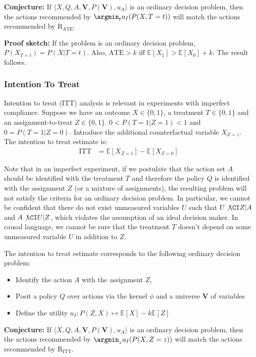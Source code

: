 \textbf{Conjecture:} If $\langle X,Q,A,\mathbf{V},P(\mathbf{V}),u_A\rangle$ is an ordinary decision problem, then the actions recommended by $\argmin_t u_I(P(X,T=t))$ will match the actions recommended by $\text{R}_{\text{ATE}}$.

\textbf{Proof sketch:} If the problem is an ordinary decision problem, $P(X_{T=t})=P(X|T=t)$. Also, $\text{ATE}>k$ iff $\mathbb{E}[X_1] > \mathbb{E}[X_0]+k$. The result follows.

\subsubsection{Intention To Treat}

Intention to treat (ITT) analysis is relevant in experiments with imperfect compliance. Suppose we have an outcome $X\in\{0,1\}$, a treatment $T\in\{0,1\}$ and an assignment-to-treat $Z\in\{0,1\}$. $0<P(T=1|Z=1)<1$ and $0=P(T=1|Z=0)$. Introduce the additional counterfactual variable $X_{Z=z}$. The intention to treat estimate is:
\begin{align}
    \text{ITT} &= \mathbb{E}[X_{Z=1}] - \mathbb{E}[X_{Z=0}]
\end{align}

Note that in an imperfect experiment, if we postulate that the action set $A$ should be identified with the treatment $T$ and therefore the policy $Q$ is identified with the assignment $Z$ (or a mixture of assignments), the resulting problem will not satisfy the criteria for an ordinary decision problem. In particular, we cannot be confident that there do not exist unmeasured variables $U$ such that $U\not\CI Z|A$ and $A\not\CI U|Z$, which violates the assumption of an ideal decision maker. In causal language, we cannot be sure that the treatment $T$ doesn't depend on some unmeasured variable $U$ in addition to $Z$.

The intention to treat estimate corresponds to the following ordinary decision problem:

\begin{itemize}
    \item Identify the action $A$ with the assignment $Z$, 
    \item Posit a policy $Q$ over actions via the kernel $\phi$ and a universe $\mathbf{V}$ of variables
    \item Define the utility $u_I: P(Z,X)\mapsto \mathbb{E}[X]-k\mathbb{E}[Z]$ 
\end{itemize}

\textbf{Conjecture:} If $\langle X,Q,A,\mathbf{V},P(\mathbf{V}),u_A\rangle$ is an ordinary decision problem, then the actions recommended by $\argmin_z u_I(P(X,Z=z))$ will match the actions recommended by $\text{R}_{\text{ITT}}$.


